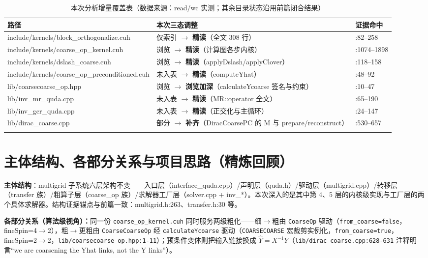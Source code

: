 \documentclass[UTF8]{ctexart}
\begin{document}
\begin{xltabular}{\textwidth}{lXX}
\toprule
路径 & 本次三态调整 & 证据命中 \\
\midrule
\endhead
include/kernels/block\_orthogonalize.cuh & 仅索引 $\to$ \textbf{精读}（全文 308 行） & :82--258 \\
include/kernels/coarse\_op\_kernel.cuh & 浏览 $\to$ \textbf{精读}（计算图各步内核） & :1074--1898 \\
include/kernels/dslash\_coarse.cuh & 浏览 $\to$ \textbf{精读}（applyDslash/applyClover） & :118--158 \\
include/kernels/coarse\_op\_preconditioned.cuh & 未入表 $\to$ \textbf{精读}（computeYhat） & :48--92 \\
lib/coarsecoarse\_op.hpp & 浏览 $\to$ \textbf{浏览加深}（calculateYcoarse 签名与约束） & :10--47 \\
lib/inv\_mr\_quda.cpp & 未入表 $\to$ \textbf{精读}（MR::operator 全文） & :65--190 \\
lib/inv\_gcr\_quda.cpp & 未入表 $\to$ \textbf{精读}（正交化与主循环） & :24--147 \\
lib/dirac\_coarse.cpp & 部分 $\to$ \textbf{补齐}（DiracCoarsePC 的 M 与 prepare/reconstruct） & :530--657 \\
\bottomrule
\caption{本次分析增量覆盖表（数据来源：read/wc 实测；其余目录状态沿用前篇闭合结果）}
\end{xltabular}

\section{主体结构、各部分关系与项目思路（精炼回顾）}

\textbf{主体结构}：multigrid 子系统六层架构不变——入口层（interface\_quda.cpp）/声明层（quda.h）/驱动层（multigrid.cpp）/转移层（transfer 族）/粗算子层（coarse\_op 族）/求解器工厂层（solver.cpp + inv\_*）。本次深入的是其中第 4、5 层的内核级实现与工厂层的两个具体求解器。\textcolor{evidence}{结构证据锚点与前篇一致：multigrid.h:263、transfer.h:30 等。}

\begin{keybox}
\textbf{各部分关系（算法级视角）：}同一份 \texttt{coarse\_op\_kernel.cuh} 同时服务两级粗化——细$\to$粗由 \texttt{CoarseOp} 驱动（\texttt{from\_coarse=false}，fineSpin=4$\to$2），粗$\to$更粗由 \texttt{CoarseCoarseOp} 经 \texttt{calculateYcoarse} 驱动（\texttt{COARSECOARSE} 宏裁剪实例化，\texttt{from\_coarse=true}，fineSpin=2$\to$2，\textcolor{evidence}{\texttt{\nolinkurl{lib/coarsecoarse_op.hpp:1-11}}}）；预条件变体则把输入链接换成 $\hat Y=X^{-1}Y$（\textcolor{evidence}{\texttt{\nolinkurl{lib/dirac_coarse.cpp:628-631}}} 注释明言``we are coarsening the Yhat links, not the Y links''）。
\end{keybox}
\end{document}
